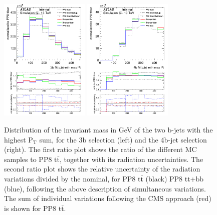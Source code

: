 \begin{figure}[!htb]
\centering
\includegraphics[width=0.38\textwidth]{Plots/ttbb/hisgenEvt_M_HardestGenBJets_4j3t__div}
\includegraphics[width=0.38\textwidth]{Plots/ttbb/hisgenEvt_M_HardestGenBJets_4j4t__div}
  \caption{Distribution of the invariant mass in GeV of the two b-jets with the highest $\mathrm{P_T}$ sum, for the 3b selection (left) and the 4b-jet selection (right). The first ratio plot shows the ratio of the different MC samples to PP8 $\mathrm{t\bar{t}}$, together with its radiation uncertainties. The second ratio plot shows the relative uncertainty of the radiation variations divided by the nominal, for PP8 $\mathrm{t\bar{t}}$ (black) PP8 tt+bb (blue), following the above description of simultaneous variations. The sum of individual variations following the CMS approach (red) is shown for PP8 $\mathrm{t\bar{t}}$. \label{ttbb:MbbmaxPT}}
\end{figure}

